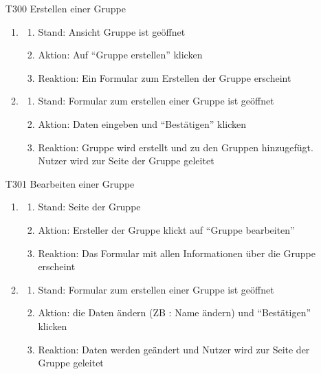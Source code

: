 \documentclass[parskip=full]{scrartcl}
\begin{document}
	\begin{itemize}
		\item[T300] Erstellen einer Gruppe
		\begin{enumerate}
			\item
			
			\begin{enumerate}[nosep]
				\item Stand: Ansicht Gruppe ist geöffnet
				\item Aktion: Auf “Gruppe erstellen” klicken
				\item Reaktion: Ein Formular zum Erstellen der  Gruppe erscheint
			\end{enumerate}
			\item
			\begin{enumerate}[nosep]	
				\item Stand: Formular zum erstellen einer Gruppe ist geöffnet
				\item Aktion: Daten eingeben und “Bestätigen” klicken
				\item Reaktion: Gruppe wird erstellt und zu den Gruppen hinzugefügt. Nutzer wird zur Seite der Gruppe geleitet
			\end{enumerate}	
		\end{enumerate}
		
		\item[T301] Bearbeiten einer Gruppe
		\begin{enumerate}
			\item
			
			\begin{enumerate}[nosep]
				\item Stand: Seite der Gruppe
				\item Aktion: Ersteller der Gruppe klickt auf “Gruppe bearbeiten”
				\item Reaktion: Das Formular mit allen Informationen über die Gruppe erscheint
			\end{enumerate}
			\item
			\begin{enumerate}[nosep]	
				\item Stand: Formular zum erstellen einer Gruppe ist geöffnet
				\item Aktion:  die Daten ändern (ZB : Name ändern) und “Bestätigen” klicken
				\item Reaktion: Daten werden geändert und Nutzer wird zur Seite der Gruppe geleitet
			\end{enumerate}	
		\end{enumerate}
		

\end{itemize}
\end{document}
